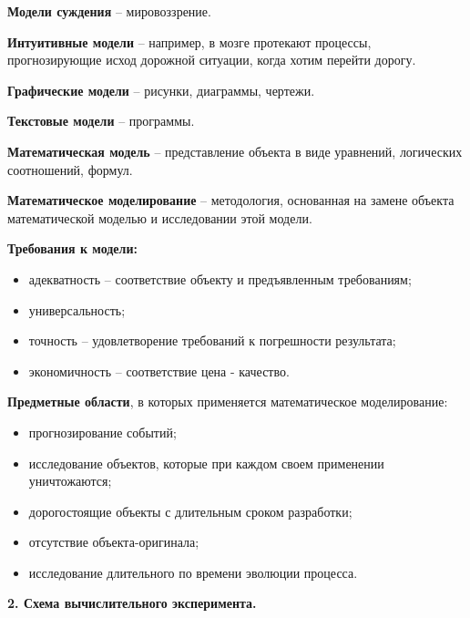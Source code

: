 \documentclass[a4paper,14pt]{article}
\begin{document}
\textbf{Модели суждения} -- мировоззрение.

\textbf{Интуитивные модели} -- например, в мозге протекают процессы, прогнозирующие исход
дорожной ситуации, когда хотим перейти дорогу.

\textbf{Графические модели} -- рисунки, диаграммы, чертежи.

\textbf{Текстовые модели} -- программы.

\textbf{Математическая модель} -- представление объекта в виде уравнений, логических соотношений, формул.

\textbf{Математическое моделирование} -- методология, основанная на замене объекта
математической моделью и исследовании этой модели.

\textbf{Требования к модели:}

\begin{itemize}
	\item адекватность -- соответствие объекту и предъявленным требованиям;
	\item универсальность;
	\item точность -- удовлетворение требований к погрешности результата;
	\item экономичность -- соответствие цена - качество.
\end{itemize}

\textbf{Предметные области}, в которых применяется математическое моделирование:

\begin{itemize}
	\item прогнозирование событий;
	\item исследование объектов, которые при каждом своем применении уничтожаются;
	\item дорогостоящие объекты с длительным сроком разработки;
	\item отсутствие объекта-оригинала;
	\item исследование длительного по времени эволюции процесса.
\end{itemize}

\textbf{2. Схема вычислительного эксперимента.}

\begin{figure}[!h]
	\label{fig:schema_exp}
\end{figure}
\end{document}
